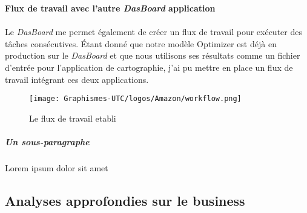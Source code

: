 {\large\textbf{{Flux de travail avec l'autre \textit{DasBoard} application}}}
\paragraph{}
\vspace{-2em}
Le \textit{DasBoard} me permet également de créer un flux de travail pour exécuter des tâches consécutives. Étant donné que notre modèle Optimizer est déjà en production sur le \textit{DasBoard} et que nous utilisons ses résultats comme un fichier d'entrée pour l'application de cartographie, j'ai pu mettre en place un flux de travail intégrant ces deux applications.
    \begin{figure}[H]
    \centering
    \texttt{[image: Graphismes-UTC/logos/Amazon/workflow.png]}
    \caption{Le flux de travail etabli}
    \end{figure}

\subparagraph{Un sous-paragraphe}
Lorem ipsum dolor sit amet

\subsection{Analyses approfondies sur le business}